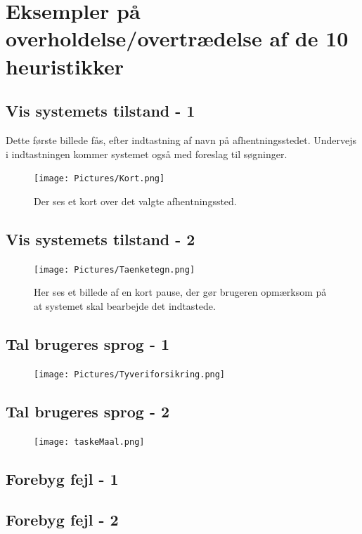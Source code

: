 \documentclass[a4paper,10pt]{article}
\begin{document}
\section{Eksempler på overholdelse/overtrædelse af de 10 heuristikker}
\subsection{ Vis systemets tilstand - 1}
Dette første billede fås, efter indtastning af navn på afhentningsstedet. Undervejs i indtastningen kommer systemet også med foreslag til søgninger.
\begin{figure}[H]
\texttt{[image: Pictures/Kort.png]}
    \centering
    \caption{Der ses et kort over det valgte afhentningssted.}
    \label{fig:my_label}
\end{figure}

\subsection{ Vis systemets tilstand - 2}%
\begin{figure}[H]
\texttt{[image: Pictures/Taenketegn.png]}
    \centering
    \caption{Her ses et billede af en kort pause, der gør brugeren opmærksom på at systemet skal bearbejde det indtastede.}
    \label{fig:my_label}
\end{figure}

\subsection{ Tal brugeres sprog - 1}%
\begin{figure}[H]
    \texttt{[image: Pictures/Tyveriforsikring.png]}
\end{figure}

\subsection{ Tal brugeres sprog - 2}%
\begin{figure}[H]
    \texttt{[image: taskeMaal.png]}
\end{figure}

\subsection{ Forebyg fejl - 1} %


\subsection{ Forebyg fejl - 2} %
\end{document}
